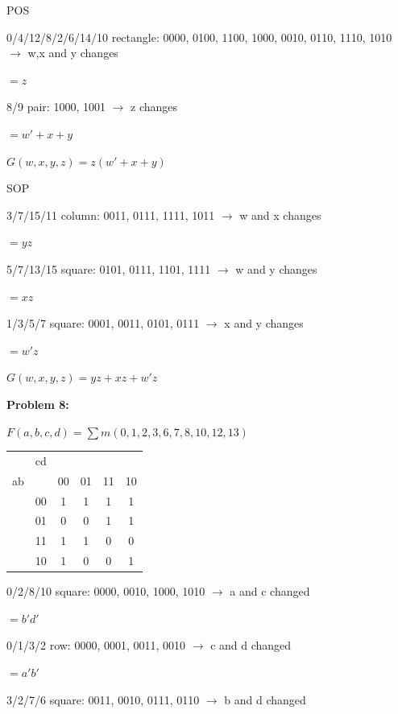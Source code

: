 \documentclass{article}
\begin{document}
    POS

    0/4/12/8/2/6/14/10 rectangle: 0000, 0100, 1100, 1000, 0010, 0110, 1110, 1010
    $\rightarrow$ w,x and y changes

    \quad $=z$

    8/9 pair: 1000, 1001 $\rightarrow$ z changes

    \quad $=w'+x+y$

    $\boxed{G(w,x,y,z) = z(w'+x+y)}$

    SOP

    3/7/15/11 column: 0011, 0111, 1111, 1011 $\rightarrow$ w and x changes

    \quad $=yz$

    5/7/13/15 square: 0101, 0111, 1101, 1111 $\rightarrow$ w and y changes

    \quad $=xz$

    1/3/5/7 square: 0001, 0011, 0101, 0111 $\rightarrow$ x and y changes

    \quad $=w'z$

    $G(w,x,y,z) = yz + xz + w'z$


    \textbf{Problem 8:}

    $F(a,b,c,d) = \sum m (0, 1, 2, 3, 6, 7, 8, 10 ,12, 13)$

    \begin{center}
        \begin{tabular} {cc|cccc}
            & cd & &&& \\
            ab && 00 & 01 & 11 & 10 \\
            \hline
            & 00 & 1 & 1 & 1 & 1 \\
            & 01 & 0 & 0 & 1 & 1 \\
            & 11 & 1 & 1 & 0 & 0 \\
            & 10 & 1 & 0 & 0 & 1 \\
        \end{tabular}
    \end{center}

    0/2/8/10 square: 0000, 0010, 1000, 1010 $\rightarrow$ a and c changed

    \quad $=b'd'$

    0/1/3/2 row: 0000, 0001, 0011, 0010 $\rightarrow$ c and d changed

    \quad $=a'b'$

    3/2/7/6 square: 0011, 0010, 0111, 0110 $\rightarrow$ b and d changed
\end{document}
